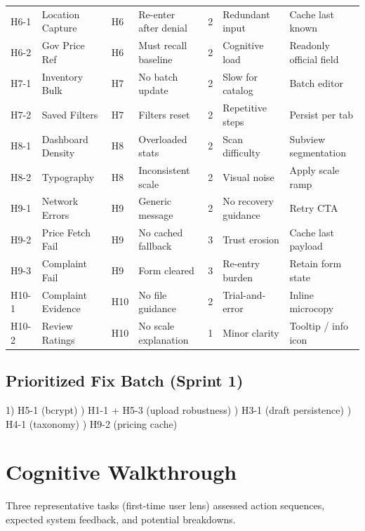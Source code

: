 \documentclass[11pt,a4paper]{article}
\begin{document}
\begin{longtable}{@{}L{1.1cm}L{2.3cm}L{1.2cm}L{4.2cm}L{0.9cm}L{2.2cm}L{3.3cm}@{}}
H6-1 & Location Capture & H6 & Re-enter after denial & 2 & Redundant input & Cache last known \\
H6-2 & Gov Price Ref & H6 & Must recall baseline & 2 & Cognitive load & Readonly official field \\
H7-1 & Inventory Bulk & H7 & No batch update & 2 & Slow for catalog & Batch editor \\
H7-2 & Saved Filters & H7 & Filters reset & 2 & Repetitive steps & Persist per tab \\
H8-1 & Dashboard Density & H8 & Overloaded stats & 2 & Scan difficulty & Subview segmentation \\
H8-2 & Typography & H8 & Inconsistent scale & 2 & Visual noise & Apply scale ramp \\
H9-1 & Network Errors & H9 & Generic message & 2 & No recovery guidance & Retry CTA \\
H9-2 & Price Fetch Fail & H9 & No cached fallback & 3 & Trust erosion & Cache last payload \\
H9-3 & Complaint Fail & H9 & Form cleared & 3 & Re-entry burden & Retain form state \\
H10-1 & Complaint Evidence & H10 & No file guidance & 2 & Trial-and-error & Inline microcopy \\
H10-2 & Review Ratings & H10 & No scale explanation & 1 & Minor clarity & Tooltip / info icon \\
\bottomrule
\end{longtable}

\subsection{Prioritized Fix Batch (Sprint 1)}
1) H5-1 (bcrypt) ) H1-1 + H5-3 (upload robustness) ) H3-1 (draft persistence) ) H4-1 (taxonomy) ) H9-2 (pricing cache)

\section{Cognitive Walkthrough}
Three representative tasks (first-time user lens) assessed action sequences, expected system feedback, and potential breakdowns.
\end{document}
